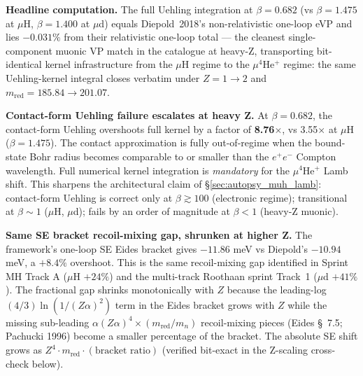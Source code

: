\documentclass[11pt]{article}
\begin{document}
\textbf{Headline computation.}  The full Uehling integration
at $\beta = 0.682$ (vs $\beta = 1.475$ at $\mu$H, $\beta = 1.400$ at
$\mu$d) equals Diepold~2018's non-relativistic one-loop eVP and lies
$-0.031\%$ from their relativistic one-loop total --- the cleanest single-component muonic VP match in
the catalogue at heavy-Z, transporting bit-identical kernel
infrastructure from the $\mu$H regime to the $\mu^4$He$^+$ regime:
the same Uehling-kernel integral closes verbatim under
$Z = 1 \to 2$ and $m_\text{red} = 185.84 \to 201.07$.

\textbf{Contact-form Uehling failure escalates at heavy Z.}  At
$\beta = 0.682$, the contact-form Uehling overshoots full kernel by a
factor of \textbf{8.76$\times$}, vs 3.55$\times$ at $\mu$H ($\beta = 1.475$).
The contact approximation is fully out-of-regime when the bound-state
Bohr radius becomes comparable to or smaller than the $e^+ e^-$
Compton wavelength.  Full numerical kernel integration is
\emph{mandatory} for the $\mu^4$He$^+$ Lamb shift.  This sharpens
the architectural claim of \S\ref{sec:autopsy_muh_lamb}: contact-form
Uehling is correct only at $\beta \gtrsim 100$ (electronic regime);
transitional at $\beta \sim 1$ ($\mu$H, $\mu$d); fails by an order of
magnitude at $\beta < 1$ (heavy-Z muonic).

\textbf{Same SE bracket recoil-mixing gap, shrunken at higher Z.}  The
framework's one-loop SE Eides bracket gives $-11.86$ meV vs Diepold's
$-10.94$ meV, a $+8.4\%$ overshoot.  This is the same recoil-mixing gap
identified in Sprint MH Track A ($\mu$H $+24\%$) and the multi-track
Roothaan sprint Track~1 ($\mu$d $+41\%$).  The fractional gap shrinks
monotonically with $Z$ because the leading-log $(4/3)\ln(1/(Z\alpha)^2)$
term in the Eides bracket grows with $Z$ while the missing sub-leading
$\alpha(Z\alpha)^4 \times (m_\text{red}/m_n)$ recoil-mixing pieces
(Eides \S~7.5; Pachucki 1996) become a smaller percentage of the bracket.
The absolute SE shift grows as $Z^4 \cdot m_\text{red} \cdot (\text{bracket
ratio})$ (verified bit-exact in the Z-scaling cross-check below).
\end{document}
